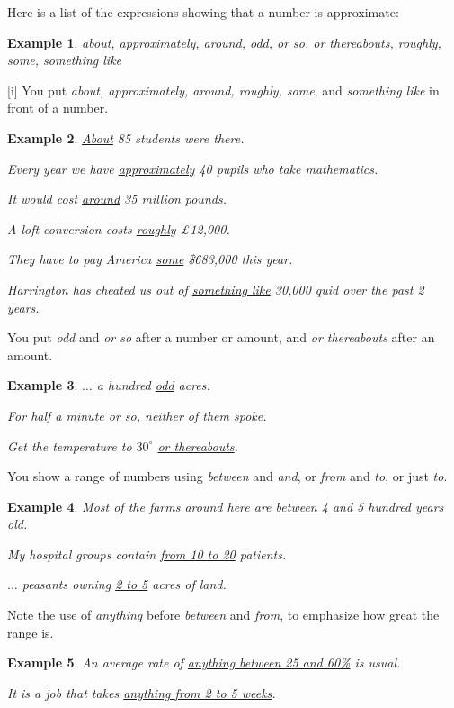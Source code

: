 \documentclass[oneside]{book}
\numberwithin{equation}{section}
\newtheorem{example}{Example}[section]
\begin{document}
%
Here is a list of the expressions showing that a number is approximate:
\begin{example}
    about, approximately, around, odd, or so, or thereabouts, roughly, some, something like
\end{example}
%
\noindent{} [i] You put \textit{about, approximately, around, roughly, some}, and \textit{something like} in front of a number.
\begin{example}
    \underline{About} 85 students were there.
    
    Every year we have \underline{approximately} 40 pupils who take mathematics.
    
    It would cost \underline{around} 35 million pounds.
    
    A loft conversion costs \underline{roughly} \pounds12,000.
    
    They have to pay America \underline{some} \$683,000 this year.
    
    Harrington has cheated us out of \underline{something like} 30,000 quid over the past 2 years.
\end{example}
You put \textit{odd} and \textit{or so} after a number or amount, and \textit{or thereabouts} after an amount.
\begin{example}
    $\ldots$ a hundred \underline{odd} acres.
    
    For half a minute \underline{or so}, neither of them spoke.
    
    Get the temperature to $30^\circ$ \underline{or thereabouts}.
\end{example}
%
\noindent{} You show a range of numbers using \textit{between} and \textit{and}, or \textit{from} and \textit{to}, or just \textit{to}.
\begin{example}
    Most of the farms around here are \underline{between 4 and 5 hundred} years old.
    
    My hospital groups contain \underline{from 10 to 20} patients.
    
    $\ldots$ peasants owning \underline{2 to 5} acres of land.
\end{example}
Note the use of \textit{anything} before \textit{between} and \textit{from}, to emphasize how great the range is.
\begin{example}
    An average rate of \underline{anything between 25 and 60\%} is usual.
    
    It is a job that takes \underline{anything from 2 to 5 weeks}.
\end{example}
\end{document}
